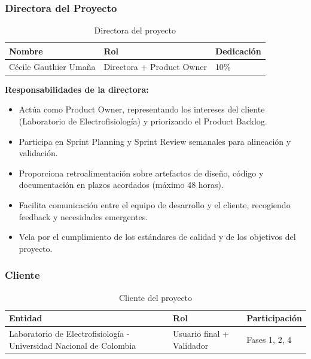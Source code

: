 \documentclass{article}
\begin{document}
\subsubsection{Directora del Proyecto}

\begin{table}[H]
\centering
\small
\begin{tabular}{|p{4cm}|p{3cm}|p{2cm}|}
\hline
\textbf{Nombre} & \textbf{Rol} & \textbf{Dedicación} \\
\hline
Cécile Gauthier Umaña & Directora + Product Owner & 10\% \\
\hline
\end{tabular}
\caption{Directora del proyecto}
\label{tab:directora}
\end{table}

\textbf{Responsabilidades de la directora:}

\begin{itemize}
    \item Actúa como Product Owner, representando los intereses del cliente (Laboratorio de Electrofisiología) y priorizando el Product Backlog.
    
    \item Participa en Sprint Planning y Sprint Review semanales para alineación y validación.
    
    \item Proporciona retroalimentación sobre artefactos de diseño, código y documentación en plazos acordados (máximo 48 horas).
    
    \item Facilita comunicación entre el equipo de desarrollo y el cliente, recogiendo feedback y necesidades emergentes.
    
    \item Vela por el cumplimiento de los estándares de calidad y de los objetivos del proyecto.
\end{itemize}

\subsubsection{Cliente}

\begin{table}[H]
\centering
\small
\begin{tabular}{|p{4cm}|p{3cm}|p{2.5cm}|}
\hline
\textbf{Entidad} & \textbf{Rol} & \textbf{Participación} \\
\hline
Laboratorio de Electrofisiología - Universidad Nacional de Colombia & Usuario final + Validador & Fases 1, 2, 4 \\
\hline
\end{tabular}
\caption{Cliente del proyecto}
\label{tab:cliente}
\end{table}
\end{document}
